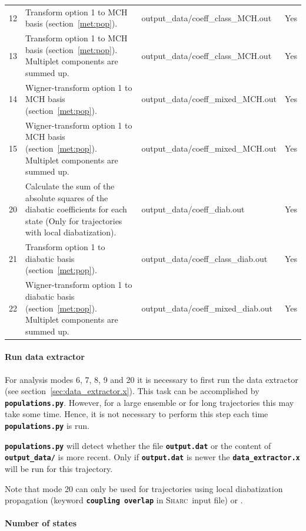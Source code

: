 \documentclass[a4paper,10pt,DIV=15,openany]{scrbook}
\newcommand{\sharc}{\textsc{Sharc}}
\newcommand{\ttt}[1]{\textbf{\texttt{#1}}}
\begin{document}
\begin{table}[tbp]
\begin{tabular}{lp{7.5cm}>{\ttfamily}lc}
    12  &Transform option 1 to MCH basis (section~\ref{met:pop}).   &output\_data/coeff\_class\_MCH.out&Yes\\
    13  &Transform option 1 to MCH basis (section~\ref{met:pop}). Multiplet components are summed up.   &output\_data/coeff\_class\_MCH.out&Yes\\
    14  &Wigner-transform option 1 to MCH basis (section~\ref{met:pop}).   &output\_data/coeff\_mixed\_MCH.out&Yes\\
    15  &Wigner-transform option 1 to MCH basis (section~\ref{met:pop}). Multiplet components are summed up.   &output\_data/coeff\_mixed\_MCH.out&Yes\\
    20  &Calculate the sum of the absolute squares of the diabatic coefficients for each state (Only for trajectories with local diabatization).      &output\_data/coeff\_diab.out&Yes\\
    21  &Transform option 1 to diabatic basis (section~\ref{met:pop}).   &output\_data/coeff\_class\_diab.out&Yes\\
    22  &Wigner-transform option 1 to diabatic basis (section~\ref{met:pop}). Multiplet components are summed up.   &output\_data/coeff\_mixed\_diab.out&Yes\\
    \hline
  \end{tabular}
\end{table}

\paragraph{Run data extractor}

For analysis modes 6, 7, 8, 9 and 20 it is necessary to first run the data extractor (see section~\ref{sec:data_extractor.x}). This task can be accomplished by \ttt{populations.py}. However, for a large ensemble or for long trajectories this may take some time. Hence, it is not necessary to perform this step each time \ttt{populations.py} is run. 

\ttt{populations.py} will detect whether the file \ttt{output.dat} or the content of \ttt{output\_data/} is more recent. Only if \ttt{output.dat} is newer the \ttt{data\_extractor.x} will be run for this trajectory.

Note that mode 20 can only be used for trajectories using local diabatization propagation (keyword \ttt{coupling overlap} in \sharc\ input file) or .

\paragraph{Number of states}
\end{document}

